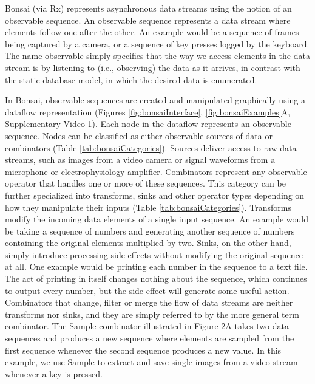 Bonsai (via Rx) represents asynchronous data streams using the notion of an observable sequence. An observable sequence represents a data stream where elements follow one after the other. An example would be a sequence of frames being captured by a camera, or a sequence of key presses logged by the keyboard. The name observable simply specifies that the way we access elements in the data stream is by listening to (i.e., observing) the data as it arrives, in contrast with the static database model, in which the desired data is enumerated.

In Bonsai, observable sequences are created and manipulated graphically using a dataflow \cite{Mosconi2000, Johnston2004} representation (Figures \ref{fig:bonsaiInterface}, \ref{fig:bonsaiExamples}A, Supplementary Video 1). Each node in the dataflow represents an observable sequence. Nodes can be classified as either observable sources of data or combinators (Table \ref{tab:bonsaiCategories}). Sources deliver access to raw data streams, such as images from a video camera or signal waveforms from a microphone or electrophysiology amplifier. Combinators represent any observable operator that handles one or more of these sequences. This category can be further specialized into transforms, sinks and other operator types depending on how they manipulate their inputs (Table \ref{tab:bonsaiCategories}). Transforms modify the incoming data elements of a single input sequence. An example would be taking a sequence of numbers and generating another sequence of numbers containing the original elements multiplied by two. Sinks, on the other hand, simply introduce processing side-effects without modifying the original sequence at all. One example would be printing each number in the sequence to a text file. The act of printing in itself changes nothing about the sequence, which continues to output every number, but the side-effect will generate some useful action. Combinators that change, filter or merge the flow of data streams are neither transforms nor sinks, and they are simply referred to by the more general term combinator. The Sample combinator illustrated in Figure 2A takes two data sequences and produces a new sequence where elements are sampled from the first sequence whenever the second sequence produces a new value. In this example, we use Sample to extract and save single images from a video stream whenever a key is pressed.

